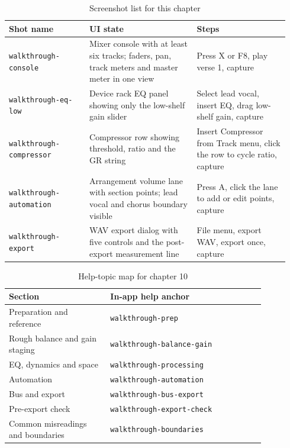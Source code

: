\begin{table}[htbp]
\centering
\small
\begin{tabular}{@{}p{0.27\linewidth}p{0.36\linewidth}p{0.31\linewidth}@{}}
\hline
Shot name & UI state & Steps \\
\hline
\texttt{walkthrough-console} & Mixer console with at least six tracks; faders, pan, track meters and master meter in one view & Press X or F8, play verse 1, capture \\
\texttt{walkthrough-eq-low} & Device rack EQ panel showing only the low-shelf gain slider & Select lead vocal, insert EQ, drag low-shelf gain, capture \\
\texttt{walkthrough-\allowbreak compressor} & Compressor row showing threshold, ratio and the GR string & Insert Compressor from Track menu, click the row to cycle ratio, capture \\
\texttt{walkthrough-\allowbreak automation} & Arrangement volume lane with section points; lead vocal and chorus boundary visible & Press A, click the lane to add or edit points, capture \\
\texttt{walkthrough-export} & WAV export dialog with five controls and the post-export measurement line & File menu, export WAV, export once, capture \\
\hline
\end{tabular}
\caption{Screenshot list for this chapter}
\label{tab:walk-screens}
\end{table}

\begin{table}[htbp]
\centering
\small
\begin{tabular}{@{}p{0.34\linewidth}p{0.52\linewidth}@{}}
\hline
Section & In-app help anchor \\
\hline
Preparation and reference & \texttt{walkthrough-prep} \\
Rough balance and gain staging & \texttt{walkthrough-balance-gain} \\
EQ, dynamics and space & \texttt{walkthrough-processing} \\
Automation & \texttt{walkthrough-\allowbreak automation} \\
Bus and export & \texttt{walkthrough-bus-export} \\
Pre-export check & \texttt{walkthrough-export-check} \\
Common misreadings and boundaries & \texttt{walkthrough-boundaries} \\
\hline
\end{tabular}
\caption{Help-topic map for chapter 10}
\label{tab:walk-help}
\end{table}

